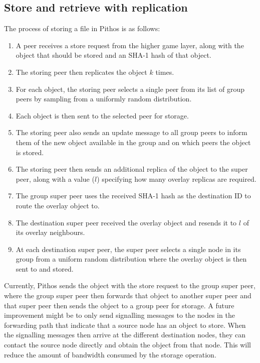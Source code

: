 \documentclass[10pt,a4paper,conference]{IEEEtran}
\begin{document}
\subsection{Store and retrieve with replication}
\label{store_retrieve}

The process of storing a file in Pithos is as follows:
\begin{enumerate}
\item A peer receives a store request from the higher game layer, along with the object that should be stored and an SHA-1 hash of that object.
\item The storing peer then replicates the object $k$ times.
\item For each object, the storing peer selects a single peer from its list of group peers by sampling from a uniformly random distribution.
\item Each object is then sent to the selected peer for storage.
\item The storing peer also sends an update message to all group peers to inform them of the new object available in the group and on which peers
    the object is stored.
\item The storing peer then sends an additional replica of the object to the super peer, along with a value ($l$) specifying how many overlay
    replicas are required.
\item The group super peer uses the received SHA-1 hash as the destination ID to route the overlay object to.
\item The destination super peer received the overlay object and resends it to $l$ of its overlay neighbours.
\item At each destination super peer, the super peer selects a single node in its group from a uniform random distribution where the overlay
    object is then sent to and stored.
\end{enumerate}

Currently, Pithos sends the object with the store request to the group super peer, where the group super peer then forwards that object to another
super peer and that super peer then sends the object to a group peer for storage. A future improvement might be to only send signalling messages to
the nodes in the forwarding path that indicate that a source node has an object to store. When the signalling messages then arrive at the different
destination nodes, they can contact the source node directly and obtain the object from that node. This will reduce the amount of bandwidth consumed
by the storage operation.
\end{document}
